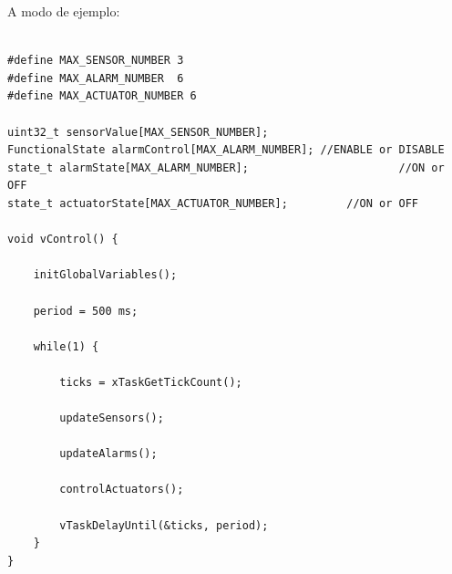 A modo de ejemplo:

\begin{lstlisting}[caption=Pseudocódigo del lazo principal de control.]  % Start your code-block

#define MAX_SENSOR_NUMBER 3
#define MAX_ALARM_NUMBER  6
#define MAX_ACTUATOR_NUMBER 6

uint32_t sensorValue[MAX_SENSOR_NUMBER];		
FunctionalState alarmControl[MAX_ALARM_NUMBER];	//ENABLE or DISABLE
state_t alarmState[MAX_ALARM_NUMBER];						//ON or OFF
state_t actuatorState[MAX_ACTUATOR_NUMBER];			//ON or OFF

void vControl() {

	initGlobalVariables();
	
	period = 500 ms;
		
	while(1) {

		ticks = xTaskGetTickCount();
		
		updateSensors();
		
		updateAlarms();
		
		controlActuators();
		
		vTaskDelayUntil(&ticks, period);
	}
}
\end{lstlisting}



